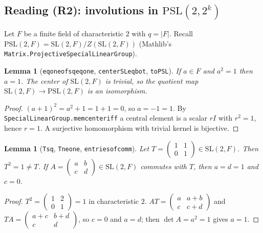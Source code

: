 \documentclass[11pt]{article}
\newtheorem{lemma}[theorem]{Lemma}
\theoremstyle{definition}
\theoremstyle{remark}
\renewcommand{\_}{\oldus\allowbreak}
\begin{document}
\subsection*{Reading (R2): involutions in $\mathrm{PSL}(2,2^k)$}

Let $F$ be a finite field of characteristic $2$ with $q=|F|$. Recall
$\mathrm{PSL}(2,F)=\mathrm{SL}(2,F)/Z(\mathrm{SL}(2,F))$ (Mathlib's \texttt{Matrix.ProjectiveSpecialLinearGroup}).

\begin{lemma}[\texttt{eq\_one\_of\_sq\_eq\_one}, \texttt{center\_SL\_eq\_bot}, \texttt{toPSL}]
If $a\in F$ and $a^2=1$ then $a=1$. The center of $\mathrm{SL}(2,F)$ is trivial, so the quotient map
$\mathrm{SL}(2,F)\to\mathrm{PSL}(2,F)$ is an isomorphism.
\end{lemma}
\begin{proof}
$(a+1)^2=a^2+1=1+1=0$, so $a=-1=1$. By \texttt{SpecialLinearGroup.mem\_center\_iff} a central element is a
scalar $rI$ with $r^2=1$, hence $r=1$. A surjective homomorphism with trivial kernel is bijective.
\end{proof}

\begin{lemma}[\texttt{T\_sq}, \texttt{T\_ne\_one}, \texttt{entries\_of\_comm}]
Let $T=\begin{pmatrix}1&1\\0&1\end{pmatrix}\in\mathrm{SL}(2,F)$. Then $T^2=1\ne T$. If
$A=\begin{pmatrix}a&b\\c&d\end{pmatrix}\in\mathrm{SL}(2,F)$ commutes with $T$, then $a=d=1$ and $c=0$.
\end{lemma}
\begin{proof}
$T^2=\begin{pmatrix}1&2\\0&1\end{pmatrix}=1$ in characteristic $2$. $AT=\begin{pmatrix}a&a+b\\c&c+d\end{pmatrix}$
and $TA=\begin{pmatrix}a+c&b+d\\c&d\end{pmatrix}$, so $c=0$ and $a=d$; then $\det A=a^2=1$ gives $a=1$.
\end{proof}
\end{document}
